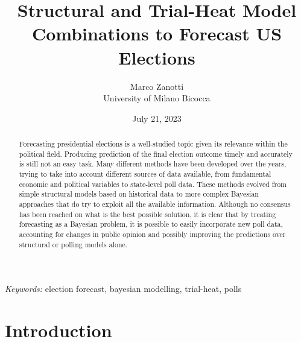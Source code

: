 \documentclass[
  12pt]{article}
\begin{document}
\def\spacingset#1{\renewcommand{\baselinestretch}%
{#1}\small\normalsize} \spacingset{1}



\date{July 21, 2023}
\title{\bf Structural and Trial-Heat Model Combinations to Forecast US
Elections}
\author{
Marco Zanotti\\
University of Milano Bicocca\\
}
\maketitle

\bigskip
\bigskip
\begin{abstract}
Forecasting presidential elections is a well-studied topic given its
relevance within the political field. Producing prediction of the final
election outcome timely and accurately is still not an easy task. Many
different methods have been developed over the years, trying to take
into account different sources of data available, from fundamental
economic and political variables to state-level poll data. These methods
evolved from simple structural models based on historical data to more
complex Bayesian approaches that do try to exploit all the available
information. Although no consensus has been reached on what is the best
possible solution, it is clear that by treating forecasting as a
Bayesian problem, it is possible to easily incorporate new poll data,
accounting for changes in public opinion and possibly improving the
predictions over structural or polling models alone.
\end{abstract}

\noindent%
{\it Keywords:} election forecast, bayesian modelling, trial-heat, polls
\vfill

\newpage
\spacingset{1.9} %
\ifdefined\Shaded\renewenvironment{Shaded}{\begin{tcolorbox}[borderline west={3pt}{0pt}{shadecolor}, enhanced, boxrule=0pt, sharp corners, breakable, frame hidden, interior hidden]}{\end{tcolorbox}}\fi

\hypertarget{sec-intro}{%
\section{Introduction}\label{sec-intro}}
\end{document}
